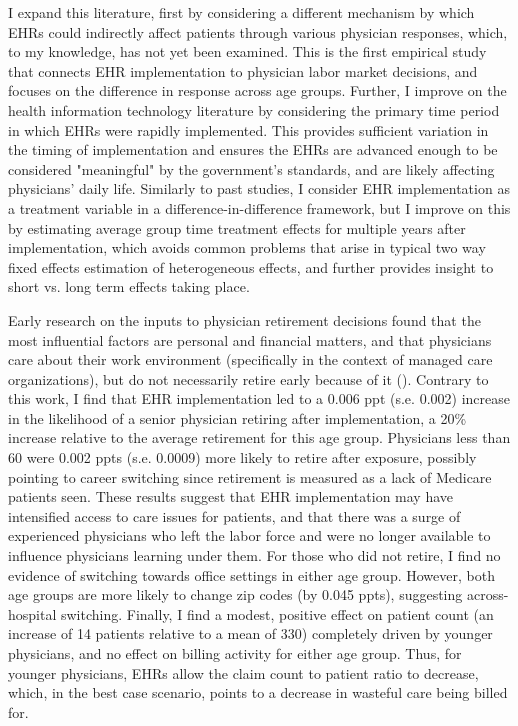 \documentclass[11pt]{article}
\begin{document}
I expand this literature, first by considering a different mechanism by which EHRs could indirectly affect patients through various physician responses, which, to my knowledge, has not yet been examined. This is the first empirical study that connects EHR implementation to physician labor market decisions, and focuses on the difference in response across age groups. Further, I improve on the health information technology literature by considering the primary time period in which EHRs were rapidly implemented. This provides sufficient variation in the timing of implementation and ensures the EHRs are advanced enough to be considered "meaningful" by the government's standards, and are likely affecting physicians' daily life. Similarly to past studies, I consider EHR implementation as a treatment variable in a difference-in-difference framework, but I improve on this by estimating average group time treatment effects for multiple years after implementation, which avoids common problems that arise in typical two way fixed effects estimation of heterogeneous effects, and further provides insight to short vs. long term effects taking place.  

Early research on the inputs to physician retirement decisions found that the most influential factors are personal and financial matters, and that physicians care about their work environment (specifically in the context of managed care organizations), but do not necessarily retire early because of it (\cite{Bahrami2002}). Contrary to this work, I find that EHR implementation led to a 0.006 ppt (s.e. 0.002) increase in the likelihood of a senior physician retiring after implementation, a 20\% increase relative to the average retirement for this age group. Physicians less than 60 were 0.002 ppts (s.e. 0.0009) more likely to retire after exposure, possibly pointing to career switching since retirement is measured as a lack of Medicare patients seen. These results suggest that EHR implementation may have intensified access to care issues for patients, and that there was a surge of experienced physicians who left the labor force and were no longer available to influence physicians learning under them. For those who did not retire, I find no evidence of switching towards office settings in either age group. However, both age groups are more likely to change zip codes (by 0.045 ppts), suggesting across-hospital switching. Finally, I find a modest, positive effect on patient count (an increase of 14 patients relative to a mean of 330) completely driven by younger physicians, and no effect on billing activity for either age group. Thus, for younger physicians, EHRs allow the claim count to patient ratio to decrease, which, in the best case scenario, points to a decrease in wasteful care being billed for. 
\end{document}
